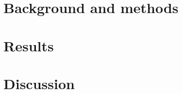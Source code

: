 \documentclass{rstransa} %
\begin{document}
\section{Background and methods}\label{sec:background}


\section{Results} \label{sec:results}



\section{Discussion}\label{sec:discussion}



\end{document}
